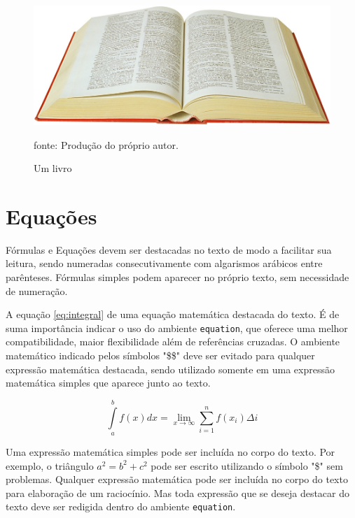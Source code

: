 \documentclass[
  12pt,		%
  a4paper,	%
  openright,%
  oneside,	%
  chapter=TITLE,		%
  section=TITLE,		%
  english,	%
  french,	%
  spanish,	%
  brazil	%
]{abntex2}
\begin{document}
                \begin{figure}[h]
                    \centering
                    \caption{Um livro}
                    \includegraphics{book}
                    \par
                    {\small fonte: Produção do próprio autor.}
                \end{figure}
    
    \chapter {Equações}
        
        Fórmulas e Equações devem ser destacadas no texto de modo a facilitar sua leitura, sendo numeradas consecutivamente com algarismos arábicos entre parênteses. Fórmulas simples podem aparecer no próprio texto, sem necessidade de numeração.
        
        A equação \ref{eq:integral} de uma equação matemática destacada do texto. É de suma importância indicar o uso do ambiente \verb|equation|, que oferece uma melhor compatibilidade, maior flexibilidade além de referências cruzadas. O ambiente matemático indicado pelos símbolos "\$\$" deve ser evitado para qualquer expressão matemática destacada, sendo utilizado somente em uma expressão matemática simples que aparece junto ao texto.
        
        \begin{equation}
            \label{eq:integral}
            \int\limits_a^b f(x) dx = \lim_{x \to \infty} \displaystyle\sum_{i=1}^{n} f(x_i) \Delta i
        \end{equation}

        Uma expressão matemática simples pode ser incluída no corpo do texto. Por exemplo, o triângulo $a^2 = b^2 + c^2$ pode ser escrito utilizando o símbolo "\$" sem problemas. Qualquer expressão matemática pode ser incluída no corpo do texto para elaboração de um raciocínio. Mas toda expressão que se deseja destacar do texto deve ser redigida dentro do ambiente \verb|equation|.
    
\end{document}
